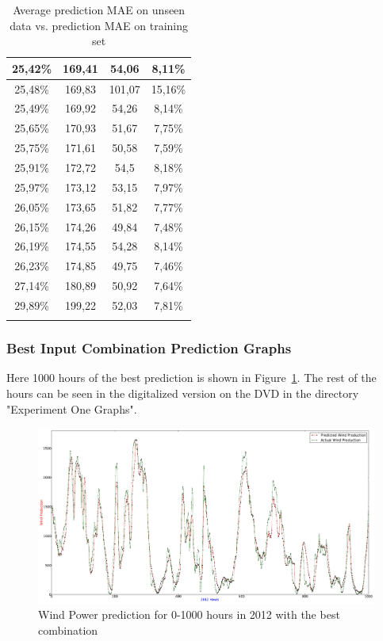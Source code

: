 \begin{center}
\begin{longtable}{|c|c|c|c|}
25,42\% & 169,41 & 54,06 & 8,11\%  \\ \hline
25,48\% & 169,83 & 101,07 & 15,16\%  \\ \hline
25,49\% & 169,92 & 54,26 & 8,14\%  \\ \hline
25,65\% & 170,93 & 51,67 & 7,75\%  \\ \hline
25,75\% & 171,61 & 50,58 & 7,59\%  \\ \hline
25,91\% & 172,72 & 54,5 & 8,18\%  \\ \hline
25,97\% & 173,12 & 53,15 & 7,97\%  \\ \hline
26,05\% & 173,65 & 51,82 & 7,77\%  \\ \hline
26,15\% & 174,26 & 49,84 & 7,48\%  \\ \hline
26,19\% & 174,55 & 54,28 & 8,14\%  \\ \hline
26,23\% & 174,85 & 49,75 & 7,46\%  \\ \hline
27,14\% & 180,89 & 50,92 & 7,64\%  \\ \hline
29,89\% & 199,22 & 52,03 & 7,81\%  \\ \hline
\caption{Average prediction MAE on unseen data vs. prediction MAE on training set}
\label{table:predictionMAEUnseenVsTrainingSetAppendix}
\end{longtable}
\end{center}
\normalsize

\subsubsection{Best Input Combination Prediction Graphs}
\label{sec:bestCombiPredictionsGraphs}
Here 1000 hours of the best prediction is shown in Figure~\ref{fig:experimentOneInput}. The rest of the hours can be seen in the digitalized version on the DVD in the directory "Experiment One Graphs".

\begin{figure}
\centering
\includegraphics[width=0.99\linewidth]{billeder/experimentOneInput.png}
\caption{Wind Power prediction for 0-1000 hours in 2012 with the best combination}
\label{fig:experimentOneInput}
\end{figure} 

